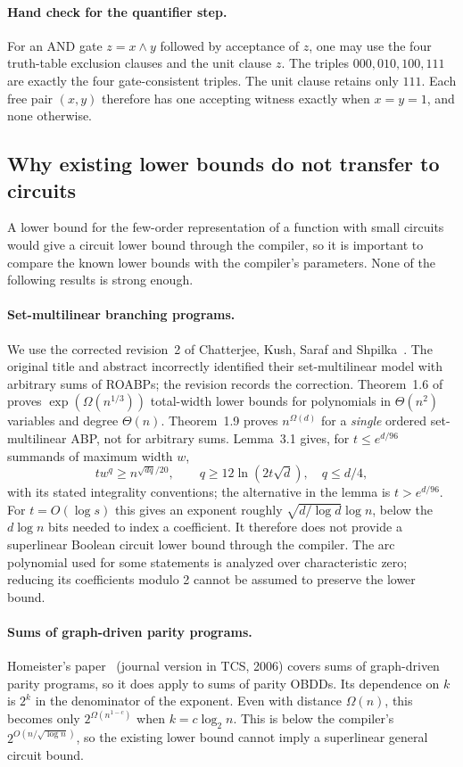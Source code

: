 \documentclass[11pt]{article}
\theoremstyle{definition}
\theoremstyle{remark}
\begin{document}
\paragraph{Hand check for the quantifier step.}
For an AND gate $z=x\wedge y$ followed by acceptance of $z$, one may
use the four truth-table exclusion clauses and the unit clause $z$.
The triples $000,010,100,111$ are exactly the four gate-consistent
triples.  The unit clause retains only $111$.
Each free pair $(x,y)$ therefore has one accepting witness exactly
when $x=y=1$, and none otherwise.

\subsection{Why existing lower bounds do not transfer to circuits}

A lower bound for the few-order representation of a function with
small circuits would give a circuit lower bound through the compiler,
so it is important to compare the known lower bounds with the
compiler's parameters. None of the following results is strong
enough.

\paragraph{Set-multilinear branching programs.}
We use the corrected revision~2 of Chatterjee, Kush, Saraf and
Shpilka~\cite{CKSS24}. The original title and abstract incorrectly
identified their set-multilinear model with arbitrary sums of ROABPs;
the revision records the correction.
Theorem~1.6 of~\cite{CKSS24} proves $\exp(\Omega(n^{1/3}))$ total-width lower bounds
for polynomials in $\Theta(n^2)$ variables and degree $\Theta(n)$.
Theorem~1.9 proves $n^{\Omega(d)}$ for a \emph{single} ordered
set-multilinear ABP, not for arbitrary sums.
Lemma~3.1 gives, for $t\le e^{d/96}$ summands of maximum width $w$,
\[
 t w^q\ge n^{\sqrt{dq}/20},
 \qquad q\ge 12\ln(2t\sqrt d),\quad q\le d/4,
\]
with its stated integrality conventions; the alternative in the
lemma is $t>e^{d/96}$.
For $t=O(\log s)$ this gives an exponent roughly
$\sqrt{d/\log d}\log n$, below the $d\log n$ bits needed to index a
coefficient.  It therefore does not provide a superlinear Boolean
circuit lower bound through the compiler.
The arc polynomial used for some statements is analyzed over
characteristic zero; reducing its coefficients modulo 2 cannot be
assumed to preserve the lower bound.

\paragraph{Sums of graph-driven parity programs.}
Homeister's paper~\cite{Homeister03} (journal version in TCS, 2006)
covers sums of graph-driven parity programs, so it
does apply to sums of parity OBDDs. Its dependence on $k$ is
$2^k$ in the denominator of the exponent.
Even with distance $\Omega(n)$, this becomes only
$2^{\Omega(n^{1-c})}$ when $k=c\log_2n$.
This is below the compiler's $2^{O(n/\sqrt{\log n})}$, so the existing
lower bound cannot imply a superlinear general circuit bound.
\end{document}
